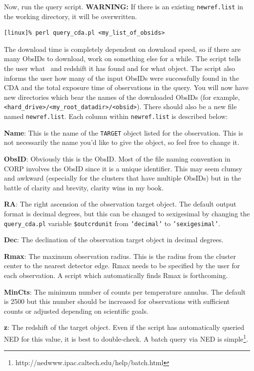 Now, run the query script. {\bf{WARNING:}} If there is an existing
{\tt{newref.list}} in the working directory, it will be overwritten.
\begin{verbatim}
[linux]% perl query_cda.pl <my_list_of_obsids>
\end{verbatim}
The download time is completely dependent on download speed, so if
there are many ObsIDs to download, work on something else for a
while. The script tells the user what \nhi\ and redshift it has found
and for what object. The script also informs the user how many of the
input ObsIDs were successfully found in the CDA and the total exposure
time of observations in the query. You will now have new directories
which bear the names of the downloaded ObsIDs (for example,
{\tt{<hard\_drive>/<my\_root\_datadir>/<obsid>}}). There should also
be a new file named {\tt{newref.list}}. Each column within
{\tt{newref.list}} is described below:

{\bf{Name}}: This is the name of the {\tt{TARGET}} object listed for
the observation. This is not necessarily the name you'd like to give
the object, so feel free to change it.

{\bf{ObsID}}: Obviously this is the ObsID. Most of the file naming
convention in CORP involves the ObsID since it is a unique
identifier. This may seem clumsy and awkward (especially for the
clusters that have multiple ObsIDs) but in the battle of clarity and
brevity, clarity wins in my book.

{\bf{RA}}: The right ascension of the observation target object. The
default output format is decimal degrees, but this can be changed to
sexigesimal by changing the {\tt{query\_cda.pl}} variable
{\tt{\$outcrdunit}} from {\tt{'decimal'}} to {\tt{'sexigesimal'}}.

{\bf{Dec}}: The declination of the observation target object in
decimal degrees.

{\bf{Rmax}}: The maximum observation radius. This is the radius from
the cluster center to the nearest detector edge. Rmax needs to be
specified by the user for each observation. A script which
automatically finds Rmax is forthcoming.

{\bf{MinCts}}: The minimum number of counts per temperature
annulus. The default is 2500 but this number should be increased for
observations with sufficient counts or adjusted depending on
scientific goals.
 
{\bf{z}}: The redshift of the target object. Even if the script has
automatically queried NED for this value, it is best to
double-check. A batch query via NED is
simple\footnote{http://nedwww.ipac.caltech.edu/help/batch.html}.

